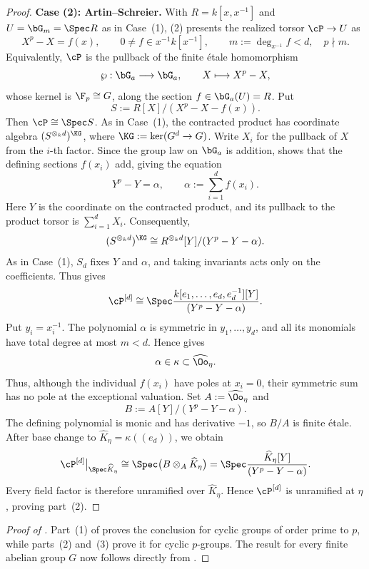 \begin{proof}
\medskip
\noindent\textbf{Case (2): Artin--Schreier.}
With $R=k[x,x^{-1}]$ and $U=\bG_m=\Spec R$ as in Case~(1),
(2) presents the realized torsor
$\cP\to U$ as
\[
    X^p-X=f(x),\qquad
    0\ne f\in x^{-1}k[x^{-1}],\qquad
    m:=\deg_{x^{-1}}f<d,\quad p\nmid m.
\]
Equivalently, $\cP$ is the pullback of the finite \'etale homomorphism
\[
    \wp:\bG_a\longrightarrow\bG_a,\qquad X\longmapsto X^p-X,
\]
whose kernel is $\F_p\cong G$, along the section
$f\in\bG_a(U)=R$. Put
\[
    S:=R[X]/(X^p-X-f(x)).
\]
Then $\cP\cong\Spec S$. As in Case~(1), the contracted product has coordinate
algebra $(S^{\otimes_k d})^{\KG}$, where
$\KG:=\ker(G^d\to G)$. Write $X_i$ for the pullback of $X$ from the $i$-th
factor. Since the group law on $\bG_a$ is addition,
 shows that the defining sections
$f(x_i)$ add, giving the equation
\[
    Y^p-Y=\alpha,
    \qquad
    \alpha:=\sum_{i=1}^d f(x_i).
\]
Here $Y$ is the coordinate on the contracted product, and its pullback to
the product torsor is $\sum_{i=1}^d X_i$. Consequently,
\[
    (S^{\otimes_k d})^{\KG}
       \cong
    R^{\otimes_k d}[Y]/(Y^p-Y-\alpha).
\]
As in Case~(1), $S_d$ fixes $Y$ and $\alpha$, and taking invariants acts
only on the coefficients. Thus
 gives
\[
    \cP^{[d]}\cong
    \Spec\frac{k[e_1,\dots,e_d,e_d^{-1}][Y]}{(Y^p-Y-\alpha)}.
\]
Put $y_i=x_i^{-1}$. The polynomial $\alpha$ is symmetric in
$y_1,\dots,y_d$, and all its monomials have total degree at most $m<d$.
Hence
 gives
\[
    \alpha\in\kappa\subset\widehat\Oo_\eta.
\]
Thus, although the individual $f(x_i)$ have poles at $x_i=0$, their
symmetric sum has no pole at the exceptional valuation.
Set $A:=\widehat\Oo_\eta$ and
\[
    B:=A[Y]/(Y^p-Y-\alpha).
\]
The defining polynomial is monic and has derivative $-1$, so $B/A$ is
finite \'etale. After base change to
$\widehat K_\eta=\kappa((e_d))$, we obtain
\[
    \cP^{[d]}\big|_{\Spec\widehat K_\eta}
       \cong
    \Spec\bigl(B\otimes_A\widehat K_\eta\bigr)
       =\Spec\frac{\widehat K_\eta[Y]}{(Y^p-Y-\alpha)}.
\]
Every field factor is therefore unramified over $\widehat K_\eta$. Hence
$\cP^{[d]}$ is unramified at $\eta$, proving part~(2).


\end{proof}

\begin{proof}[Proof of ]
Part~(1) of  proves the conclusion
for cyclic groups of order prime to $p$, while parts~(2) and~(3) prove it
for cyclic $p$-groups. The result for every finite abelian group $G$ now
follows directly from .
\end{proof}
